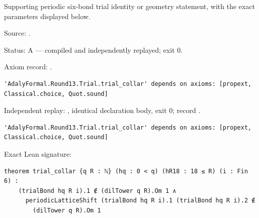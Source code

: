 \begin{theorem}[bp-365]
\label{bp-365}
\leanok
Supporting periodic six-bond trial identity or geometry statement, with the exact parameters displayed below.

\par Source: \texttt{}.
\par Status: A — compiled and independently replayed; exit 0.
\par Axiom record: \texttt{}.
\begin{verbatim}
'AdalyFormal.Round13.Trial.trial_collar' depends on axioms: [propext, Classical.choice, Quot.sound]
\end{verbatim}
\par Independent replay: \texttt{}, identical declaration body, exit 0; record \texttt{}.
\begin{verbatim}
'AdalyFormal.Round13.Trial.trial_collar' depends on axioms: [propext, Classical.choice, Quot.sound]
\end{verbatim}
\par Exact Lean signature:
\begin{verbatim}
theorem trial_collar {q R : ℕ} (hq : 0 < q) (hR18 : 18 ≤ R) (i : Fin 6) :
    (trialBond hq R i).1 ∉ (dilTower q R).Om 1 ∧
      periodicLatticeShift (trialBond hq R i).1 (trialBond hq R i).2 ∉
        (dilTower q R).Om 1
\end{verbatim}
\end{theorem}

